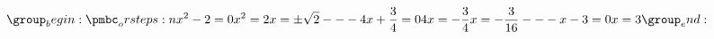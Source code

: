 \documentclass[varwidth, border = 3pt]{standalone}
\begin{document}
\[
\orsteps{
    x^2 - 2 = 0        \\
    x^2 = 2            \\
      x = \pm \sqrt{2}
    ---
    4 x + \dfrac{3}{4} = 0 \\
    4 x = - \dfrac{3}{4}   \\
      x = - \dfrac{3}{16}
    ---
    x - 3 = 0  \\
				       \\
      x = 3
}
\]
\end{document}
